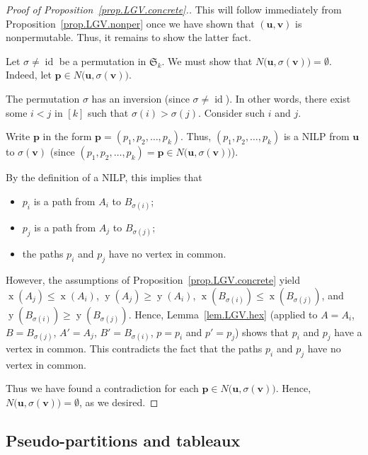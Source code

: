 \documentclass[reqno]{amsart}
\newcommand{\0}{\phantom{c}}
\newcommand{\SymGp}[1]{\mathfrak{S}_{#1}} %
\DeclareMathOperator{\xcoord}{x} %
\DeclareMathOperator{\ycoord}{y} %
\DeclareMathOperator{\id}{id} %
\newcommand{\pp}{\mathbf{p}}
\newcommand{\uu}{\mathbf{u}}
\newcommand{\vv}{\mathbf{v}}
\newenvironment{verlonglong}{}{}
\newcommand{\tup}[1]{\left( #1 \right)}
\newcommand{\ive}[1]{\left[ #1 \right]}
\theoremstyle{plain}
\theoremstyle{definition}
\numberwithin{equation}{section}
\begin{document}
\begin{verlonglong}
\begin{proof}[Proof of Proposition~\ref{prop.LGV.concrete}.]
This will follow immediately from Proposition~\ref{prop.LGV.nonper}
once we have shown that $\left( \uu,\vv\right)  $ is nonpermutable.
Thus, it remains to show the latter fact.

Let $\sigma\neq\id$ be a permutation in $\SymGp{k}$.
We must show that $N\bigl(\uu, \sigma(\vv) \bigr) = \emptyset$.
Indeed, let $\pp\in N\bigl( \uu,\sigma(\vv) \bigr)$.

The permutation $\sigma$ has an inversion (since $\sigma \neq \id$).
In other words, there exist some $i<j$ in $\ive{k}$ such that $\sigma(i) > \sigma(j)$.
Consider such $i$ and $j$.

Write $\pp$ in the form $\pp = \tup{p_1, p_2, \dotsc, p_k}$.
Thus, $\tup{p_1, p_2, \dotsc, p_k}$ is a NILP from $\uu$ to $\sigma(\vv)$ (since $\tup{p_1, p_2, \dotsc, p_k} = \pp\in N\bigl( \uu, \sigma(\vv) \bigr)$).

By the definition of a NILP, this implies that
\begin{itemize}
\item $p_i$ is a path from $A_i$ to $B_{\sigma(i)}$;

\item $p_j$ is a path from $A_j$ to $B_{\sigma(j)}$;

\item the paths $p_i$ and $p_j$ have no vertex in common.
\end{itemize}

However, the assumptions of Proposition~\ref{prop.LGV.concrete} yield
$\xcoord(A_j) \leq \xcoord(A_i)$,
$\ycoord(A_j) \geq \ycoord(A_i)$,
$\xcoord(B_{\sigma(i)}) \leq \xcoord(B_{\sigma(j)})$, and
$\ycoord(B_{\sigma(i)}) \geq \ycoord(B_{\sigma(j)})$.
Hence, Lemma~\ref{lem.LGV.hex} (applied to $A = A_i$, $B = B_{\sigma(j)}$, $A' = A_j$, $B' = B_{\sigma(i)}$, $p = p_i$ and $p' = p_j$) shows that $p_i$ and $p_j$ have a vertex in common.
This contradicts the fact that the paths $p_i$ and $p_j$ have no vertex in common.

Thus we have found a contradiction for each $\pp\in N\bigl( \uu,\sigma(\vv) \bigr)$.
Hence, $N\bigl(\uu, \sigma(\vv) \bigr) = \emptyset$, as we desired.
\end{proof}
\end{verlonglong}


\subsection{Pseudo-partitions and tableaux}
\end{document}
